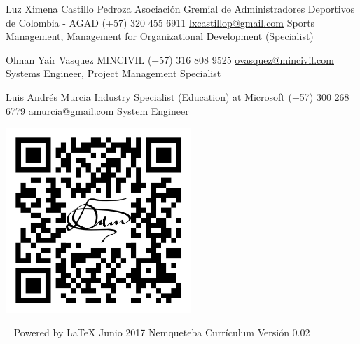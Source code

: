 \documentclass[overlapped,line,final]{res}
\begin{document}
\begin{resume}

Luz Ximena Castillo Pedroza \newline
Asociación Gremial de Administradores Deportivos de Colombia - AGAD \newline
(+57) 320 455 6911 \newline
\href{mailto:lxcastillop@gmail.com}{lxcastillop@gmail.com} \newline
Sports Management, Management for Organizational Development (Specialist)

Olman Yair Vasquez\newline
MINCIVIL\newline
(+57) 316 808 9525\newline
\href{mailto:ovasquez@mincivil.com}{ovasquez@mincivil.com}\newline
Systems Engineer, Project Management Specialist

Luis Andrés Murcia\newline
Industry Specialist (Education) at Microsoft\newline
(+57) 300 268 6779\newline
\href{mailto:amurcia@gmail.com}{amurcia@gmail.com}\newline
System Engineer

\vspace{\fill}
\begin{minipage}{1.0\linewidth}
\begin{center}	
	\includegraphics[width=7cm,bb=0 0 1147 1147]{./qr.png}
\end{center}
\end{minipage}


\vspace{\fill}\ \newline
{\tiny \rm $ $Powered by \LaTeX $ $ }
{\tiny \rm $ $Junio 2017$ $ }
{\tiny \rm $ $Nemqueteba Currículum Versión 0.02 $ $ }

\end{resume}
\end{document}
